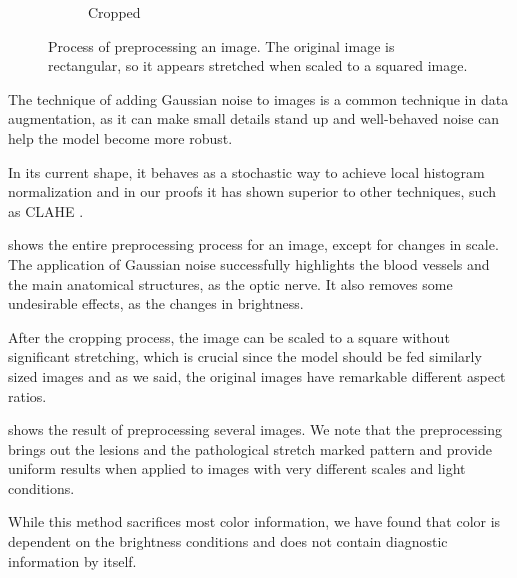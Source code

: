 \begin{figure}[tb]
\begin{subfigure}[b]{0.24\textwidth}
        \caption{Cropped}
    \end{subfigure}
    \caption{Process of preprocessing an image. The original image is rectangular, so it appears stretched when scaled to a squared image.}
    \label{fig:completePreprocess}
\end{figure}

The technique of adding Gaussian noise to images is a common technique in data augmentation, as it can make small details stand up and well-behaved noise can help the model become more robust. 

In its current shape, it behaves as a stochastic way to achieve local histogram normalization and in our proofs it has shown superior to other techniques, such as CLAHE \cite{pizer1987adaptive}. 

 shows the entire preprocessing process for an image, except for changes in scale. The application of Gaussian noise successfully highlights the blood vessels and the main anatomical structures, as the optic nerve. It also removes some undesirable effects, as the changes in brightness.

After the cropping process, the image can be scaled to a square without significant stretching, which is crucial since the model should be fed similarly sized images and as we said, the original images have remarkable different aspect ratios.

 shows the result of preprocessing several images. We note that the preprocessing brings out the lesions and the pathological stretch marked pattern and provide uniform results when applied to images with very different scales and light conditions.

While this method sacrifices most color information, we have found that color is dependent on the brightness conditions and does not contain diagnostic information by itself.

